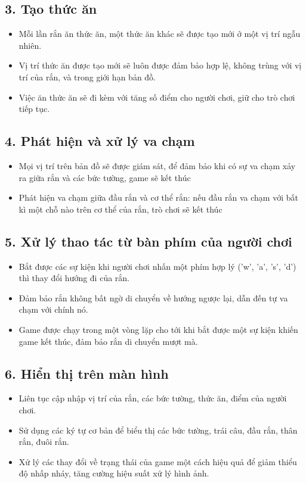 \documentclass[12pt]{report}
\begin{document}
\subsection*{3. Tạo thức ăn}
\begin{itemize}
    \item Mỗi lần rắn ăn thức ăn, một thức ăn khác sẽ được tạo mới ở một vị trí ngẫu nhiên.
    \item Vị trí thức ăn được tạo mới sẽ luôn được đảm bảo hợp lệ, không trùng với vị trí của rắn, và trong giới hạn bản đồ.
    \item Việc ăn thức ăn sẽ đi kèm với tăng số điểm cho người chơi, giữ cho trò chơi tiếp tục.
\end{itemize}

\subsection*{4. Phát hiện và xử lý va chạm}
\begin{itemize}
    \item Mọi vị trí trên bản đồ sẽ được giám sát, để đảm bảo khi có sự va chạm xảy ra giữa rắn và các bức tường, game sẽ kết thúc
    \item Phát hiện va chạm giữa đầu rắn và cơ thể rắn: nếu đầu rắn va chạm với bất kì một chỗ nào trên cơ thể của rắn, trò chơi sẽ kết thúc
\end{itemize}

\subsection*{5. Xử lý thao tác từ bàn phím của người chơi}
\begin{itemize}
    \item Bắt được các sự kiện khi người chơi nhấn một phím hợp lý ('w', 'a', 's', 'd') thì thay đổi hướng đi của rắn.
    \item Đảm bảo rắn không bất ngờ di chuyển về hướng ngược lại, dẫn đến tự va chạm với chính nó.
    \item Game được chạy trong một vòng lặp cho tới khi bắt được một sự kiện khiến game kết thúc, đảm bảo rắn di chuyển mượt mà.
\end{itemize}

\subsection*{6. Hiển thị trên màn hình}
\begin{itemize}
    \item Liên tục cập nhập vị trí của rắn, các bức tường, thức ăn, điểm của người chơi.
    \item Sử dụng các ký tự cơ bản để biểu thị các bức tường, trái câu, đầu rắn, thân rắn, đuôi rắn.
    \item Xử lý các thay đổi về trạng thái của game một cách hiệu quả để giảm thiểu độ nhấp nháy, tăng cường hiệu suất xử lý hình ảnh.
\end{itemize}
\end{document}
